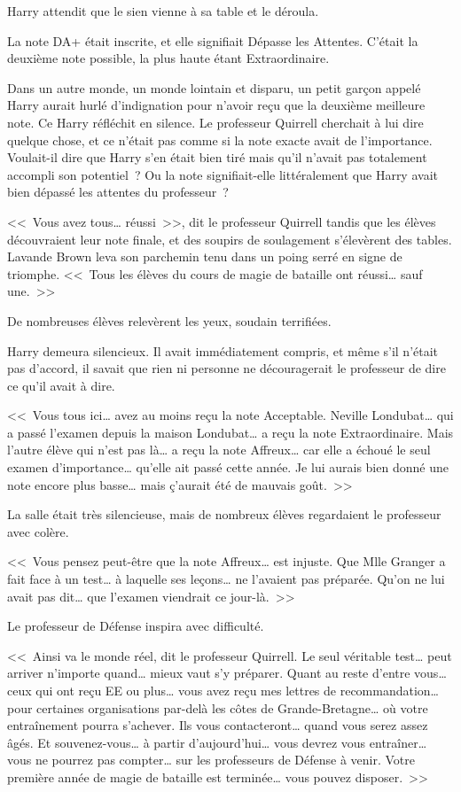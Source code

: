 Harry attendit que le sien vienne à sa table et le déroula.

La note DA+ était inscrite, et elle signifiait Dépasse les Attentes. C'était la deuxième note possible, la plus haute étant Extraordinaire.

Dans un autre monde, un monde lointain et disparu, un petit garçon appelé Harry aurait hurlé d'indignation pour n'avoir reçu que la deuxième meilleure note. Ce Harry réfléchit en silence. Le professeur Quirrell cherchait à lui dire quelque chose, et ce n'était pas comme si la note exacte avait de l'importance. Voulait-il dire que Harry s'en était bien tiré mais qu'il n'avait pas totalement accompli son potentiel~? Ou la note signifiait-elle littéralement que Harry avait bien dépassé les attentes du professeur~?

<<~Vous avez tous… réussi~>>, dit le professeur Quirrell tandis que les élèves découvraient leur note finale, et des soupirs de soulagement s'élevèrent des tables. Lavande Brown leva son parchemin tenu dans un poing serré en signe de triomphe. <<~Tous les élèves du cours de magie de bataille ont réussi… sauf une.~>>

De nombreuses élèves relevèrent les yeux, soudain terrifiées.

Harry demeura silencieux. Il avait immédiatement compris, et même s'il n'était pas d'accord, il savait que rien ni personne ne découragerait le professeur de dire ce qu'il avait à dire.

<<~Vous tous ici… avez au moins reçu la note Acceptable. Neville Londubat… qui a passé l'examen depuis la maison Londubat… a reçu la note Extraordinaire. Mais l'autre élève qui n'est pas là… a reçu la note Affreux… car elle a échoué le seul examen d'importance… qu'elle ait passé cette année. Je lui aurais bien donné une note encore plus basse… mais ç'aurait été de mauvais goût.~>>

La salle était très silencieuse, mais de nombreux élèves regardaient le professeur avec colère.

<<~Vous pensez peut-être que la note Affreux… est injuste. Que Mlle Granger a fait face à un test… à laquelle ses leçons… ne l'avaient pas préparée. Qu'on ne lui avait pas dit… que l'examen viendrait ce jour-là.~>>

Le professeur de Défense inspira avec difficulté.

<<~Ainsi va le monde réel, dit le professeur Quirrell. Le seul véritable test… peut arriver n'importe quand… mieux vaut s'y préparer. Quant au reste d'entre vous… ceux qui ont reçu EE ou plus… vous avez reçu mes lettres de recommandation… pour certaines organisations par-delà les côtes de Grande-Bretagne… où votre entraînement pourra s'achever. Ils vous contacteront… quand vous serez assez âgés. Et souvenez-vous… à partir d'aujourd'hui… vous devrez vous entraîner… vous ne pourrez pas compter… sur les professeurs de Défense à venir. Votre première année de magie de bataille est terminée… vous pouvez disposer.~>>

